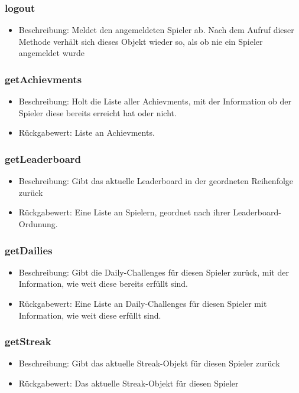 \documentclass[a4paper]{scrreprt}
\begin{document}
    \subsubsection{logout}
    \begin{itemize}
        \item Beschreibung: Meldet den angemeldeten Spieler ab. Nach dem Aufruf dieser Methode verhält sich dieses Objekt wieder so, als ob nie ein Spieler angemeldet wurde
    \end{itemize}
    \subsubsection{getAchievments}
    \begin{itemize}
        \item Beschreibung: Holt die Liste aller Achievments, mit der Information ob der Spieler diese bereits erreicht hat oder nicht.
        \item Rückgabewert: Liste an Achievments. 
    \end{itemize}
    \subsubsection{getLeaderboard}
    \begin{itemize}
        \item Beschreibung: Gibt das aktuelle Leaderboard in der geordneten Reihenfolge zurück
        \item Rückgabewert: Eine Liste an Spielern, geordnet nach ihrer Leaderboard-Ordunung. 
    \end{itemize}
    \subsubsection{getDailies}
    \begin{itemize}
        \item Beschreibung: Gibt die Daily-Challenges für diesen Spieler zurück, mit der Information, wie weit diese bereits erfüllt sind.
        \item Rückgabewert: Eine Liste an Daily-Challenges für diesen Spieler mit Information, wie weit diese erfüllt sind.
    \end{itemize}
    \subsubsection{getStreak}
    \begin{itemize}
        \item Beschreibung: Gibt das aktuelle Streak-Objekt für diesen Spieler zurück
        \item Rückgabewert: Das aktuelle Streak-Objekt für diesen Spieler 
    \end{itemize}
\end{document}
